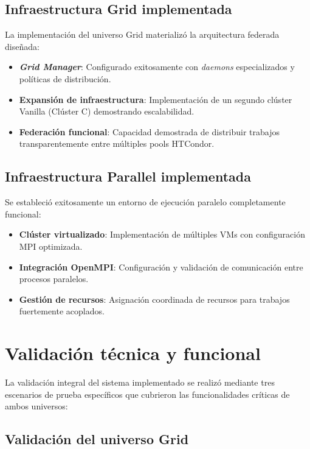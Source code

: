 \subsection{Infraestructura Grid implementada}
\noindent

La implementación del universo Grid materializó la arquitectura federada diseñada:

\begin{itemize}
    \item \textbf{\textit{Grid Manager}}: Configurado exitosamente con \textit{daemons} especializados y políticas de distribución.
    \item \textbf{Expansión de infraestructura}: Implementación de un segundo clúster Vanilla (Clúster C) demostrando escalabilidad.
    \item \textbf{Federación funcional}: Capacidad demostrada de distribuir trabajos transparentemente entre múltiples pools HTCondor.
\end{itemize}

\subsection{Infraestructura Parallel implementada}
\noindent

Se estableció exitosamente un entorno de ejecución paralelo completamente funcional:

\begin{itemize}
    \item \textbf{Clúster virtualizado}: Implementación de múltiples VMs con configuración MPI optimizada.
    \item \textbf{Integración OpenMPI}: Configuración y validación de comunicación entre procesos paralelos.
    \item \textbf{Gestión de recursos}: Asignación coordinada de recursos para trabajos fuertemente acoplados.
\end{itemize}

\section{Validación técnica y funcional}
\noindent

La validación integral del sistema implementado se realizó mediante tres escenarios de prueba específicos que cubrieron las funcionalidades críticas de ambos universos:

\subsection{Validación del universo Grid}
\noindent

